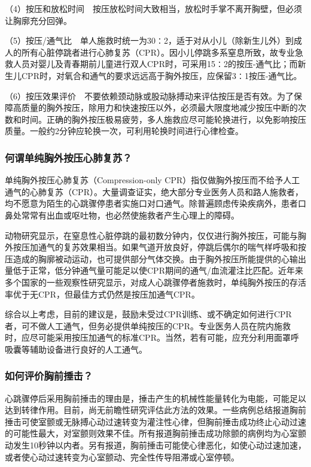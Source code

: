 （4）按压和放松时间　按压放松时间大致相当，放松时手掌不离开胸壁，但必须让胸廓充分回弹。

（5）按压/通气比　单人施救时统一为30∶2，适于对从小儿（除新生儿外）到成人的所有心脏停跳者进行心肺复苏（CPR）。因小儿停跳多系窒息所致，故专业急救人员对婴儿及青春期前儿童进行双人CPR时，可采用15∶2的按压-通气比；而新生儿CPR时，对氧合和通气的要求远远高于胸外按压，应保留3∶1按压-通气比。

（6）按压效果评价　不要依赖颈动脉或股动脉搏动来评估按压是否有效。为了保障高质量的胸外按压，除用力和快速按压以外，必须最大限度地减少按压中断的次数和时间。正确的胸外按压极易疲劳，多人施救应尽可能轮换进行，以免影响按压质量。一般约2分钟应轮换一次，可利用轮换时间进行心律检查。

\subsubsection{何谓单纯胸外按压心肺复苏？}

单纯胸外按压心肺复苏（Compression-only
CPR）指仅做胸外按压而不给予人工通气的心肺复苏（CPR）。大量调查证实，绝大部分专业医务人员和路人施救者，均不愿意为陌生的心跳骤停患者实施口对口通气。除普遍顾虑传染疾病外，患者口鼻处常常有出血或呕吐物，也必然使施救者产生心理上的障碍。

动物研究显示，在窒息性心脏停跳的最初数分钟内，仅仅进行胸外按压，可能与胸外按压加通气的复苏效果相当。如果气道开放良好，停跳后偶尔的喘气样呼吸和按压造成的胸廓被动运动，也可提供部分气体交换。由于胸外按压所能提供的心输出量低于正常，低分钟通气量可能足以使CPR期间的通气/血流灌注比匹配。近年来多个国家的一些观察性研究显示，对成人心跳骤停者施救时，单纯胸外按压的存活率优于无CPR，但最佳方式仍然是按压加通气CPR。

综合以上考虑，目前的建议是，鼓励未受过CPR训练、或不确定如何进行CPR者，可不做人工通气，但务必提供单纯按压的CPR。专业医务人员在院内施救时，应尽可能采用按压加通气的标准CPR。当然，若有可能，应充分利用面罩呼吸囊等辅助设备进行良好的人工通气。

\subsubsection{如何评价胸前捶击？}

心跳骤停后采用胸前捶击的理由是，捶击产生的机械性能量转化为电能，可能足以达到转律作用。目前，尚无前瞻性研究评估此方法的效果。一些病例总结报道胸前捶击可使室颤或无脉搏心动过速转变为灌注性心律，但胸前捶击成功终止心动过速的可能性最大，对室颤则效果不佳。所有报道胸前捶击成功除颤的病例均为心室颤动发生10秒钟以内者。另有报道，胸前捶击可能使心律恶化，如使心动过速加速，或者使心动过速转变为心室颤动、完全性传导阻滞或心室停顿。

